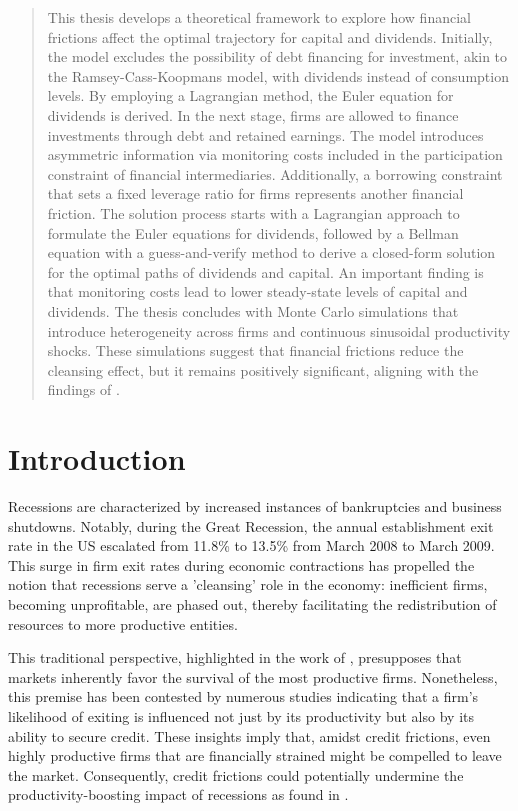 \documentclass[12pt]{report}
\begin{document}
\begin{abstract}
    This thesis develops a theoretical framework to explore how financial frictions affect the optimal trajectory for
    capital and dividends. Initially, the model excludes the possibility of debt financing for investment, akin to
    the Ramsey-Cass-Koopmans model, with dividends instead of consumption levels. By employing a Lagrangian method,
    the Euler equation for dividends is derived. In the next stage, firms are allowed to finance investments through
    debt and retained earnings. The model introduces asymmetric information via monitoring costs included in the
    participation constraint of financial intermediaries. Additionally, a borrowing constraint that sets a fixed
    leverage ratio for firms represents another financial friction. The solution process starts with a Lagrangian
    approach to formulate the Euler equations for dividends, followed by a Bellman equation with a
    guess-and-verify method to derive a closed-form solution for the optimal paths of dividends and capital. An
    important finding is that monitoring costs lead to lower steady-state levels of capital and dividends. The thesis concludes
    with Monte Carlo simulations that introduce heterogeneity across firms and continuous sinusoidal productivity shocks.
    These simulations suggest that financial frictions reduce the cleansing effect, but it remains positively
    significant, aligning with the findings of \cite{OsePap17}.
\end{abstract}


\tableofcontents
\chapter{Introduction} 

Recessions are characterized by increased instances of bankruptcies and business shutdowns. Notably, during the Great
Recession, the annual establishment exit rate in the US escalated from 11.8\% to 13.5\% from March 2008 to March 2009.
This surge in firm exit rates during economic contractions has propelled the notion that
recessions serve a 'cleansing' role in the economy: inefficient firms, becoming unprofitable, are phased out, thereby
facilitating the redistribution of resources to more productive entities. 

This traditional perspective, highlighted in the work of \cite{CabHarm94}, presupposes that markets
inherently favor the survival of the most productive firms. Nonetheless, this premise has been contested by numerous
studies indicating that a firm's likelihood of exiting is influenced not just by its productivity but also by its
ability to secure credit. These
insights imply that, amidst credit frictions, even highly productive firms that are financially strained might be
compelled to leave the market. Consequently, credit frictions could potentially undermine the productivity-boosting
impact of recessions as found in \cite{OsePap17}. 
\end{document}
